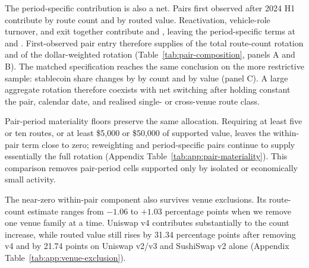 The period-specific contribution is also a net. Pairs first observed after 2024 H1 contribute \PairLifecycleCountEntry{} by route count and \PairLifecycleValueEntry{} by routed value. Reactivation, vehicle-role turnover, and exit together contribute \PairLifecycleCountOffset{} and \PairLifecycleValueOffset{}, leaving the period-specific terms at \PairLifecycleCountNet{} and \PairLifecycleValueNet{}. First-observed pair entry therefore supplies \PairLifecycleCountEntryShare{} of the total route-count rotation and \PairLifecycleValueEntryShare{} of the dollar-weighted rotation (Table~\ref{tab:pair-composition}, panels A and B). The matched specification reaches the same conclusion on the more restrictive sample: stablecoin share changes by \MatchedMarketCountChange{} by count and \MatchedMarketValueChange{} by value (panel C). A large aggregate rotation therefore coexists with \PairPooledWithin{} net switching after holding constant the pair, calendar date, and realised single- or cross-venue route class.

Pair-period materiality floors preserve the same allocation. Requiring at least five or ten routes, or at least \$5,000 or \$50,000 of supported value, leaves the within-pair term close to zero; reweighting and period-specific pairs continue to supply essentially the full rotation (Appendix Table~\ref{tab:app:pair-materiality}). This comparison removes pair-period cells supported only by isolated or economically small activity.

The near-zero within-pair component also survives venue exclusions. Its route-count estimate ranges from $-1.06$ to $+1.03$ percentage points when we remove one venue family at a time. Uniswap v4 contributes substantially to the count increase, while routed value still rises by 31.34 percentage points after removing v4 and by 21.74 points on Uniswap v2/v3 and SushiSwap v2 alone (Appendix Table~\ref{tab:app:venue-exclusion}).

